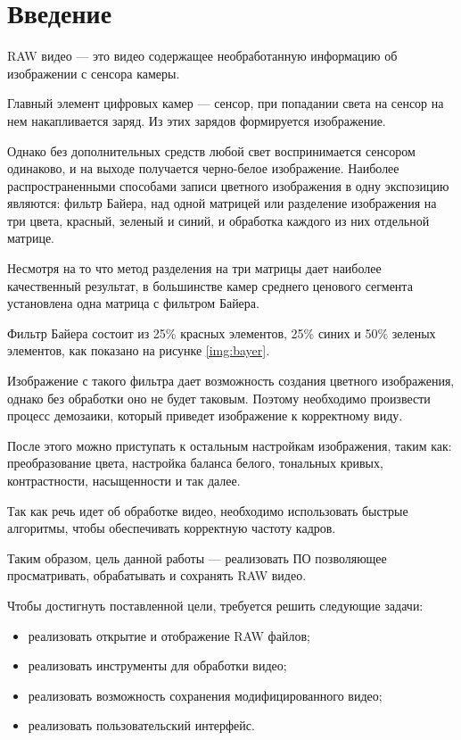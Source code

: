 \chapter*{Введение}

RAW видео --- это видео содержащее необработанную информацию об изображении с сенсора камеры.

Главный элемент цифровых камер --- сенсор, при попадании света на сенсор на нем накапливается заряд. Из этих зарядов формируется изображение.

Однако без дополнительных средств любой свет воспринимается сенсором одинаково, и на выходе получается черно-белое изображение. Наиболее распространенными способами записи цветного изображения в одну экспозицию являются: фильтр Байера, над одной матрицей или разделение изображения на три цвета, красный, зеленый и синий, и обработка каждого из них отдельной матрице. \cite{color}

Несмотря на то что метод разделения на три матрицы дает наиболее качественный результат, в большинстве камер среднего ценового сегмента установлена одна матрица с фильтром Байера.

Фильтр Байера состоит из 25\% красных элементов, 25\% синих и 50\% зеленых элементов, как показано на рисунке \ref{img:bayer}.


Изображение с такого фильтра дает возможность создания цветного изображения, однако без обработки оно не будет таковым. Поэтому необходимо произвести процесс демозаики, который приведет изображение к корректному виду. 

После этого можно приступать к остальным настройкам изображения, таким как: преобразование цвета, настройка баланса белого, тональных кривых, контрастности, насыщенности и так далее.

Так как речь идет об обработке видео, необходимо использовать быстрые алгоритмы, чтобы обеспечивать корректную частоту кадров.
 
Таким образом, цель данной работы --- реализовать ПО позволяющее просматривать, обрабатывать и сохранять RAW видео.

Чтобы достигнуть поставленной цели, требуется решить следующие задачи:
\begin{itemize}
	\item реализовать открытие и отображение RAW файлов;
	\item реализовать инструменты для обработки видео;
	\item реализовать возможность сохранения модифицированного видео;
	\item реализовать пользовательский интерфейс.
\end{itemize}
